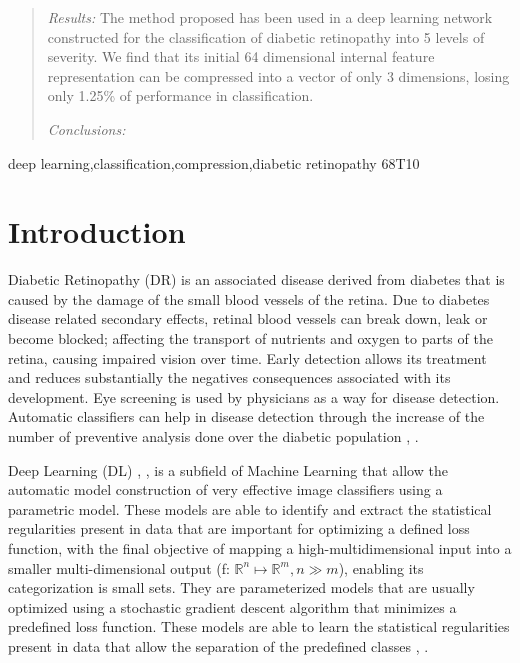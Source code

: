 \documentclass[review]{elsarticle}
\theoremstyle{definition} %
\theoremstyle{remark}
\begin{document}
\begin{frontmatter}
\begin{abstract}
\emph{Results:} The method proposed has been used in a deep learning network constructed for the classification of diabetic retinopathy into 5 levels of severity. We find that its initial 64 dimensional internal feature representation can be compressed into a vector of only 3 dimensions, losing only 1.25\% of performance in classification. 

\emph{Conclusions:} 

\end{abstract}

\begin{keyword}
deep learning\sep classification\sep compression\sep diabetic retinopathy
\MSC[2010] 68T10
\end{keyword}

\end{frontmatter}


\section{Introduction}

Diabetic Retinopathy (DR) is an associated disease derived from diabetes that is caused by the damage of the small blood vessels of the retina. Due to diabetes disease related secondary effects, retinal blood vessels can break down, leak or become blocked; affecting the transport of nutrients and oxygen to parts of the retina, causing impaired vision over time. Early detection allows its treatment and reduces substantially the negatives consequences associated with its development. Eye screening is used by physicians as a way for disease detection. Automatic classifiers can help in disease detection through the increase of the number of preventive analysis done over the diabetic population \cite{pedro2010prevalence}, \cite{romero2011managing}.

Deep Learning (DL) \cite{nature-deep-learning}, \cite{Schmidhuber-nn}, is a subfield of Machine Learning that allow the automatic model construction of very effective image classifiers using a parametric model. These models are able to identify and extract the statistical regularities present in data that are important for optimizing a defined loss function, with the final objective of mapping a high-multidimensional input into a smaller multi-dimensional output (f: $\mathbb{R}^{n} \mapsto \mathbb{R}^{m}, n \gg m$), enabling its categorization is small sets. They are parameterized models that are usually optimized using a stochastic gradient descent algorithm that minimizes a predefined loss function. These models are able to learn the statistical regularities present in data that allow the separation of the predefined classes \cite{Bengio:2013:RLR:2498740.2498889}, \cite{bengio-2009}.
\end{document}
